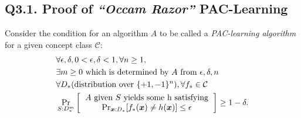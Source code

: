 \documentclass[a4paper,12pt]{article}
\begin{document}
\subsection*{Q3.1. Proof of \emph{``Occam Razor''} PAC-Learning}
\noindent
Consider the condition for an algorithm $A$ to be called a \emph{PAC-learning algorithm} for a given concept class $\mathcal{C}$: \cite{lec3}
\begin{equation} \label{pac}
    \begin{aligned}
        & \forall \epsilon,\delta, 0 < \epsilon,\delta < 1, \forall n \geq 1, \\
        & \exists m \geq 0 \mbox{ which is determined by } A \mbox{ from } \epsilon,\delta,n \\
        & \forall D_{*} (\mbox{distribution over }\{+1,-1\}^{n}), \forall f_{*} \in \mathcal{C} \\
        & \Pr_{S:D^m_*} \left [
            \begin{tabular}{c}
                $A$ given $S$ yields some h satisfying \\
                $ \Pr_{\boldsymbol{x}:D_*}[f_{*}(\boldsymbol{x}) \neq h(\boldsymbol{x})] \leq \epsilon $
            \end{tabular}
        \right ] \geq 1 - \delta.
    \end{aligned}
\end{equation}
\end{document}
